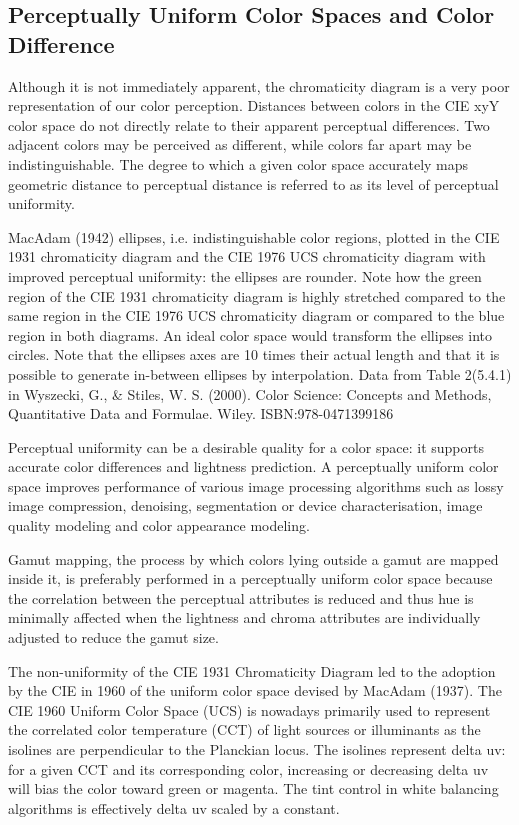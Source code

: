 \subsection{Perceptually Uniform Color Spaces and Color Difference}

Although it is not immediately apparent, the chromaticity diagram is a very poor representation of our color perception. Distances between colors in the CIE xyY color space do not directly relate to their apparent perceptual differences. Two adjacent colors may be perceived as different, while colors far apart may be indistinguishable. The degree to which a given color space accurately maps geometric distance to perceptual distance is referred to as its level of perceptual uniformity.


MacAdam (1942) ellipses, i.e. indistinguishable color regions, plotted in the CIE 1931 chromaticity diagram and the CIE 1976 UCS chromaticity diagram with improved perceptual uniformity: the ellipses are rounder. Note how the green region of the CIE 1931 chromaticity diagram is highly stretched compared to the same region in the CIE 1976 UCS chromaticity diagram or compared to the blue region in both diagrams. An ideal color space would transform the ellipses into circles. Note that the ellipses axes are 10 times their actual length and that it is possible to generate in-between ellipses by interpolation. Data from Table 2(5.4.1) in Wyszecki, G., & Stiles, W. S. (2000). Color Science: Concepts and Methods, Quantitative Data and Formulae. Wiley. ISBN:978-0471399186

Perceptual uniformity can be a desirable quality for a color space: it supports accurate color differences and lightness prediction. A perceptually uniform color space improves performance of various image processing algorithms such as lossy image compression, denoising, segmentation or device characterisation, image quality modeling and color appearance modeling.

Gamut mapping, the process by which colors lying outside a gamut are mapped inside it, is preferably performed in a perceptually uniform color space because the correlation between the perceptual attributes is reduced and thus hue is minimally affected when the lightness and chroma attributes are individually adjusted to reduce the gamut size.

The non-uniformity of the CIE 1931 Chromaticity Diagram led to the adoption by the CIE in 1960 of the uniform color space devised by MacAdam (1937). The CIE 1960 Uniform Color Space (UCS) is nowadays primarily used to represent the correlated color temperature (CCT) of light sources or illuminants as the isolines are perpendicular to the Planckian locus. The isolines represent delta uv: for a given CCT and its corresponding color, increasing or decreasing delta uv will bias the color toward green or magenta. The tint control in white balancing algorithms is effectively delta uv scaled by a constant.
 

